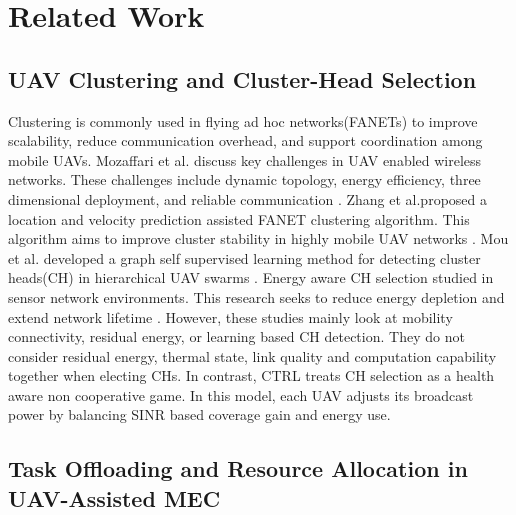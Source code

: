 \documentclass[journal]{IEEEtran}
\begin{document}
\section{Related Work}

\subsection{UAV Clustering and Cluster-Head Selection}

Clustering is commonly used in flying ad hoc networks(FANETs) to improve scalability, reduce communication overhead, and support coordination among mobile UAVs. Mozaffari et al. discuss key challenges in UAV enabled wireless networks. These challenges include dynamic topology, energy efficiency, three dimensional deployment, and reliable communication \cite{ref7}. Zhang et al.proposed a location and velocity prediction assisted FANET clustering algorithm. This algorithm aims to improve cluster stability in highly mobile UAV networks \cite{ref6}. Mou et al. developed a graph self supervised learning method for detecting cluster heads(CH) in hierarchical UAV swarms \cite{ref3}. Energy aware CH selection studied in sensor network environments. This research seeks to reduce energy depletion and extend network lifetime \cite{ref4}. However, these studies mainly look at mobility connectivity, residual energy, or learning based CH detection. They do not consider residual energy, thermal state, link quality and computation capability together when electing CHs. In contrast, CTRL treats CH selection as a health aware non cooperative game. In this model, each UAV adjusts its broadcast power by balancing SINR based coverage gain and energy use.

\subsection{Task Offloading and Resource Allocation in UAV-Assisted MEC}
\end{document}
